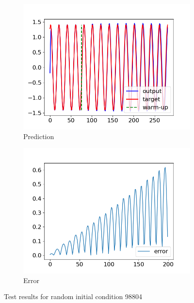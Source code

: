 \begin{figure}[h]
	\centering
	\begin{subfigure}[b]{0.45\textwidth}
		\includegraphics[width=\textwidth]{../Results/Test-Task02/Figures/RNN-lstm-RDIM_1-N_used_50000-NUM-LAY_1-SIZE-LAY_100-ACT_tanh-ISH_statefull-SL_8-PL_4-LR_0.001-DKP_1.0-ZKP_1.0-HSPL_300-IPL_200-NL_1-WID_0/prediction_augmend_TEST_98804.png}
		\caption{Prediction}
	\end{subfigure}
	\begin{subfigure}[b]{0.45\textwidth}
		\includegraphics[width=\textwidth]{../Results/Test-Task02/Figures/RNN-lstm-RDIM_1-N_used_50000-NUM-LAY_1-SIZE-LAY_100-ACT_tanh-ISH_statefull-SL_8-PL_4-LR_0.001-DKP_1.0-ZKP_1.0-HSPL_300-IPL_200-NL_1-WID_0/prediction_TEST_98804_error.png}
		\caption{Error}
	\end{subfigure}
	\caption{Test results for random initial condition 98804}
	\label{2:predictions2}
\end{figure}

\newpage